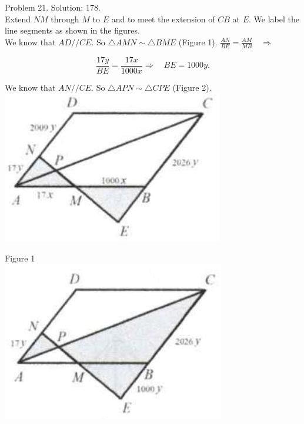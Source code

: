 \documentclass[10pt]{article}
\begin{document}
Problem 21. Solution: 178.\\
Extend \(N M\) through \(M\) to \(E\) and to meet the extension of \(C B\) at \(E\). We label the line segments as shown in the figures.\\
We know that \(A D / / C E\). So \(\triangle A M N \sim \triangle B M E\) (Figure 1). \(\frac{A N}{B E}=\frac{A M}{M B} \quad \Rightarrow\)

\[
\frac{17 y}{B E}=\frac{17 x}{1000 x} \Rightarrow \quad B E=1000 y .
\]

We know that \(A N / / C E\). So \(\triangle A P N \sim \triangle C P E\) (Figure 2).\\
\includegraphics[max width=\textwidth, center]{2025_04_17_97bc1f7e44d93c271a88g-142(3)}

Figure 1\\
\includegraphics[max width=\textwidth, center]{2025_04_17_97bc1f7e44d93c271a88g-142}
\end{document}
